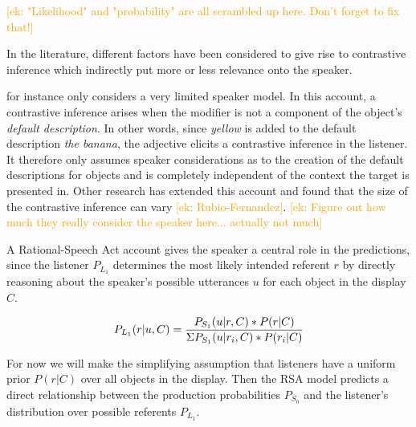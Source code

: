 \documentclass[10pt,letterpaper]{article}
\newcommand{\ek}[1]{\textcolor{Orange}{[ek: #1]}}
\begin{document}
\ek{"Likelihood" and "probability" are all scrambled up here. Don't forget to fix that!}

In the literature, different factors have been considered to give rise to contrastive inference which indirectly put more or less relevance onto the speaker. 

 for instance only considers a very limited speaker model. In this account, a contrastive inference arises when the modifier is not a component of the object's \textit{default description}. In other words, since \textit{yellow} is added to the default description \textit{the banana}, the adjective elicits a contrastive inference in the listener. It therefore only assumes speaker considerations as to the creation of the default descriptions for objects and is completely independent of the context the target is presented in. 
Other research has extended this account and found that the size of the contrastive inference can vary \cite{Aparicio:2018}\ek{Rubio-Fernandez}. \ek{Figure out how much they really consider the speaker here... actually not much}


A Rational-Speech Act account gives the speaker a central role in the predictions, since the listener $P_{L_1}$ determines the most likely intended referent $r$ by directly reasoning about the speaker's possible utterances $u$ for each object in the display $C$. 

\begin{equation}
	P_{L_1}(r|u,C) = \frac{P_{S_1}(u|r,C) * P(r|C)}{\Sigma \space P_{S_1}(u|r_{i},C) * P(r_{i}|C)}
\label{eq-prior}
\end{equation}

For now we will make the simplifying assumption that listeners have a uniform prior $P(r|C)$ over all objects in the display. Then the RSA model predicts a direct relationship between the production probabilities $P_{S_0}$ and the listener's distribution over possible referents $P_{L_1}$. 
\end{document}
